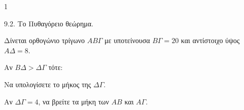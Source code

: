 \begin{ylh}{1}
    \item 9.2. Το Πυθαγόρειο θεώρημα.
\end{ylh}
Δίνεται ορθογώνιο τρίγωνο $AB\Gamma$ με υποτείνουσα $B\Gamma=20$ και αντίστοιχο ύψος $A\Delta=8$.

Αν $B\Delta>\Delta\Gamma$ τότε:
\begin{alist}
\item Να υπολογίσετε το μήκος της $\Delta\Gamma$. 
\item Αν $\Delta\Gamma=4$, να βρείτε τα μήκη των $AB$ και $A\Gamma$. 
\end{alist}